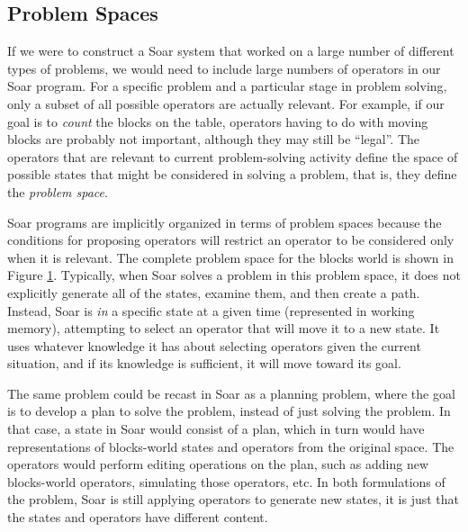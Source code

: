 \subsection{Problem Spaces}
\label{ARCH-functions-ps}

If we were to construct a Soar system that worked on a large number of
different types of problems, we would need to include large numbers of
operators in our Soar program. For a specific problem and a
particular stage in problem solving, only a subset of all possible operators
are actually relevant. For example, if our goal is to \textit{count} the
blocks on the table, operators having to do with moving blocks are probably
not important, although they may still be ``legal''. The operators that are
relevant to current problem-solving activity define the space of possible
states that might be considered in solving a problem, that is, they define the
\emph{problem space}.

Soar programs are implicitly organized in terms of problem spaces
because the conditions for proposing operators will restrict an operator
to be considered only when it is relevant.  The complete problem space
for the blocks world is shown in Figure \ref{fig:blocks-ps}.  Typically,
when Soar solves a problem in this problem space, it does not explicitly
generate all of the states, examine them, and then create a path.
Instead, Soar is \emph{in} a specific state at a given time (represented
in working memory), attempting to select an operator that will move it
to a new state.  It uses whatever knowledge it has about selecting
operators given the current situation, and if its knowledge is
sufficient, it will move toward its goal.

\begin{figure}
\label{fig:blocks-ps}
\end{figure}

The same problem could be recast in Soar as a planning problem, where
the goal is to develop a plan to solve the problem, instead of just
solving the problem.  In that case, a state in Soar would consist of a
plan, which in turn would have representations of blocks-world states
and operators from the original space.  The operators would perform
editing operations on the plan, such as adding new blocks-world
operators, simulating those operators, etc.  In both formulations of the
problem, Soar is still applying operators to generate new states, it is
just that the states and operators have different content.

